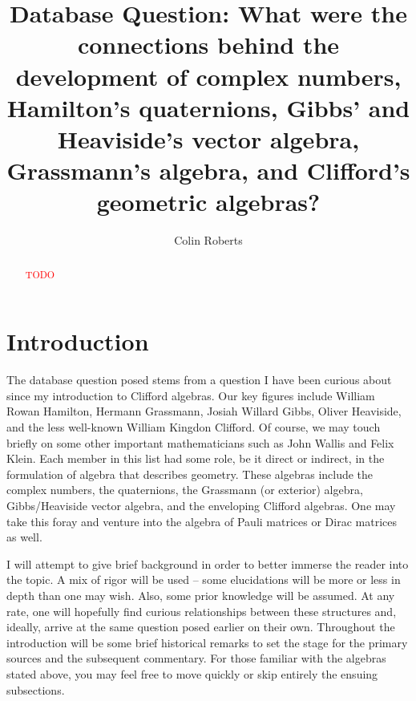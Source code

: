 \documentclass[12pt]{article}
\title{Database Question: What were the connections behind the development of complex numbers, Hamilton's quaternions, Gibbs' and Heaviside's vector algebra, Grassmann's algebra, and Clifford's geometric algebras?}
\author{Colin Roberts}
\begin{document}
 \begin{titlingpage}
     \maketitle
     \vfill
     \begin{abstract}
        \textcolor{red}{TODO}
     \end{abstract}
 \end{titlingpage}


\section{Introduction}
The database question posed stems from a question I have been curious about since my introduction to Clifford algebras. Our key figures include William Rowan Hamilton, Hermann Grassmann, Josiah Willard Gibbs, Oliver Heaviside, and the less well-known William Kingdon Clifford. Of course, we may touch briefly on some other important mathematicians such as John Wallis and Felix Klein. Each member in this list had some role, be it direct or indirect, in the formulation of algebra that describes geometry. These algebras include the complex numbers, the quaternions, the Grassmann (or exterior) algebra, Gibbs/Heaviside vector algebra, and the enveloping Clifford algebras. One may take this foray and venture into the algebra of Pauli matrices or Dirac matrices as well.

I will attempt to give brief background in order to better immerse the reader into the topic. A mix of rigor will be used -- some elucidations will be more or less in depth than one may wish. Also, some prior knowledge will be assumed. At any rate, one will hopefully find curious relationships between these structures and, ideally, arrive at the same question posed earlier on their own. Throughout the introduction will be some brief historical remarks to set the stage for the primary sources and the subsequent commentary. For those familiar with the algebras stated above, you may feel free to move quickly or skip entirely the ensuing subsections. 
\end{document}

